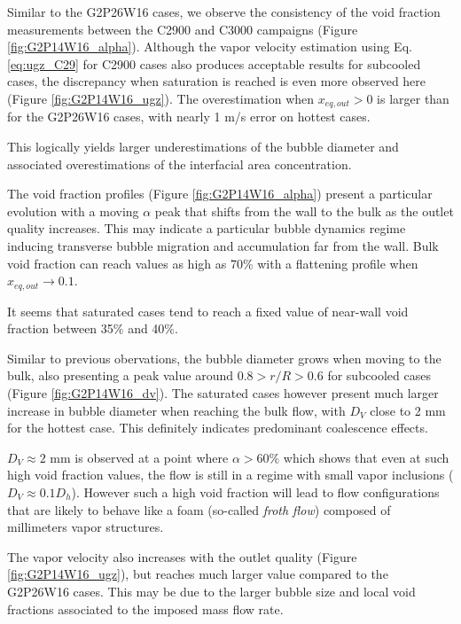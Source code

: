 Similar to the G2P26W16 cases, we observe the consistency of the void fraction measurements between the C2900 and C3000 campaigns (Figure \ref{fig:G2P14W16_alpha}). Although the vapor velocity estimation using Eq. \ref{eq:ugz_C29} for C2900 cases also produces acceptable results for subcooled cases, the discrepancy when saturation is reached is even more observed here (Figure \ref{fig:G2P14W16_ugz}). The overestimation when $x_{eq,out}>0$ is larger than for the G2P26W16 cases, with nearly 1 m/s error on hottest cases. 

This logically yields larger underestimations of the bubble diameter and associated overestimations of the interfacial area concentration.

\npar

The void fraction profiles (Figure \ref{fig:G2P14W16_alpha}) present a particular evolution with a moving $\alpha$ peak that shifts from the wall to the bulk as the outlet quality increases. This may indicate a particular bubble dynamics regime inducing transverse bubble migration and accumulation far from the wall. Bulk void fraction can reach values as high as 70\% with a flattening profile when $x_{eq,out} \to 0.1$.

\begin{remark*}{}
It seems that saturated cases tend to reach a fixed value of near-wall void fraction between 35\% and 40\%.
\end{remark*}

\npar

Similar to previous obervations, the bubble diameter grows when moving to the bulk, also presenting a peak value around $0.8 > r/R > 0.6$ for subcooled cases (Figure \ref{fig:G2P14W16_dv}). The saturated cases however present much larger increase in bubble diameter when reaching the bulk flow, with $D_{V}$ close to 2 mm for the hottest case. This definitely indicates predominant coalescence effects.

\begin{remark*}{}
$D_{V}\approx 2$ mm is observed at a point where $\alpha >60\%$ which shows that even at such high void fraction values, the flow is still in a regime with small vapor inclusions ($D_{V} \approx 0.1 D_{h}$). However such a high void fraction will lead to flow configurations that are likely to behave like a foam (so-called \textit{froth flow}) composed of millimeters vapor structures.
\end{remark*}

\npar

The vapor velocity also increases with the outlet quality (Figure \ref{fig:G2P14W16_ugz}), but reaches much larger value compared to the G2P26W16 cases. This may be due to the larger bubble size and local void fractions associated to the imposed mass flow rate.


